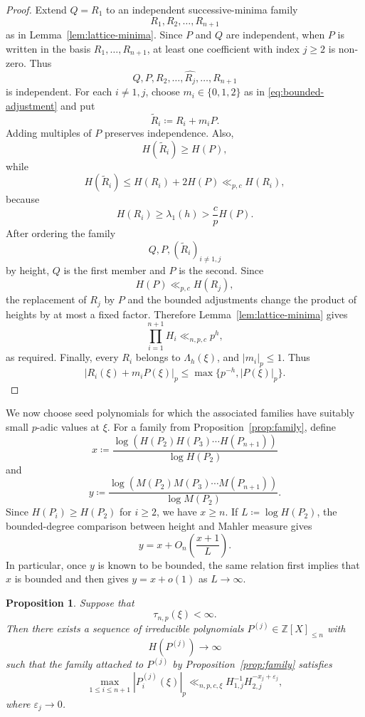 \documentclass[12pt,reqno]{amsart}
\newtheorem{proposition}[theorem]{Proposition}
\theoremstyle{definition}
\theoremstyle{remark}
\newcommand{\Z}{\mathbb Z}
\begin{document}
\begin{proof}
Extend $Q=R_1$ to an independent successive-minima family
$$
R_1,R_2,\ldots,R_{n+1}
$$
as in Lemma~\ref{lem:lattice-minima}. Since $P$ and $Q$ are independent, when $P$ is written in the basis $R_1,\ldots,R_{n+1}$, at least one coefficient with index $j\geq2$ is non-zero. Thus
$$
Q,P,R_2,\ldots,\widehat{R_j},\ldots,R_{n+1}
$$
is independent. For each $i\neq1,j$, choose $m_i\in\{0,1,2\}$ as in
\eqref{eq:bounded-adjustment} and put
$$
\widetilde R_i\coloneqq R_i+m_iP.
$$
Adding multiples of $P$ preserves independence. Also,
$$
H(\widetilde R_i)\geq H(P),
$$
while
$$
H(\widetilde R_i)
\leq H(R_i)+2H(P)
\ll_{p,c}H(R_i),
$$
because
$$
H(R_i)\geq\lambda_1(h)>\frac{c}{p}H(P).
$$
After ordering the family
$$
Q,P,(\widetilde R_i)_{i\neq1,j}
$$
by height, $Q$ is the first member and $P$ is the second. Since
$$
H(P)\ll_{p,c}H(R_j),
$$
the replacement of $R_j$ by $P$ and the bounded adjustments change the product of heights by at most a fixed factor. Therefore Lemma~\ref{lem:lattice-minima} gives
$$
\prod_{i=1}^{n+1}H_i\ll_{n,p,c}p^h,
$$
as required. Finally, every $R_i$ belongs to $\Lambda_h(\xi)$, and $|m_i|_p\leq1$. Thus
$$
|R_i(\xi)+m_iP(\xi)|_p
\leq\max\{p^{-h},|P(\xi)|_p\}.
$$
\end{proof}


We now choose seed polynomials for which the associated families have suitably small $p$-adic
values at $\xi$. For a family from
Proposition~\ref{prop:family}, define
$$
x\coloneqq
\frac{\log(H(P_2)H(P_3)\cdots H(P_{n+1}))}{\log H(P_2)}
$$
and
$$
y\coloneqq
\frac{\log(M(P_2)M(P_3)\cdots M(P_{n+1}))}{\log M(P_2)}.
$$
Since $H(P_i)\geq H(P_2)$ for $i\geq2$, we have $x\geq n$.
If $L\coloneqq\log H(P_2)$, the bounded-degree comparison between height and Mahler measure gives
\begin{equation}\label{eq:x-y-comparison}
y=x+O_n\left(\frac{x+1}{L}\right).
\end{equation}
In particular, once $y$ is known to be bounded, the same relation first implies that $x$ is bounded and then gives $y=x+o(1)$ as $L\to\infty$.

\begin{proposition}\label{prop:good-seeds}
Suppose that
$$
\tau_{n,p}(\xi)<\infty.
$$
Then there exists a sequence of irreducible polynomials
$P^{(j)}\in\Z[X]_{\leq n}$ with
$$
H(P^{(j)})\longrightarrow\infty
$$
such that the family attached to $P^{(j)}$ by Proposition~\ref{prop:family} satisfies
$$
\max_{1\leq i\leq n+1}|P_i^{(j)}(\xi)|_p
\ll_{n,p,c,\xi}
H_{1,j}^{-1}H_{2,j}^{-x_j+\varepsilon_j},
$$
where $\varepsilon_j\to0$.
\end{proposition}
\end{document}
